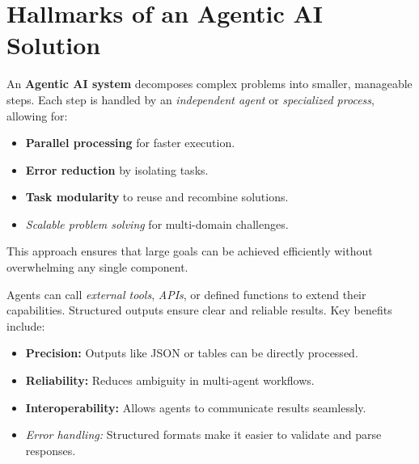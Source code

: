 \documentclass[a4paper, 12pt]{article}
\begin{document}
\section*{Hallmarks of an Agentic AI Solution}
\begin{tcolorbox}[title={1. Decomposition of Larger Problems into Smaller Steps}, colback=blue!5!white, colframe=blue!75!black]
An \textbf{Agentic AI system} decomposes complex problems into smaller, manageable steps. Each step is handled by an \textit{independent agent} or \textit{specialized process}, allowing for:  
\begin{itemize}
    \item \textbf{Parallel processing} for faster execution.
    \item \textbf{Error reduction} by isolating tasks.
    \item \textbf{Task modularity} to reuse and recombine solutions.
    \item \textit{Scalable problem solving} for multi-domain challenges.
\end{itemize}
This approach ensures that large goals can be achieved efficiently without overwhelming any single component.
\end{tcolorbox}
\vspace{0.5cm}
\begin{tcolorbox}[title={2. Use of Tools, Function Calling, and Structured Outputs}, colback=green!5!white, colframe=green!75!black]
Agents can call \textit{external tools}, \textit{APIs}, or defined functions to extend their capabilities. Structured outputs ensure clear and reliable results. Key benefits include:  
\begin{itemize}
    \item \textbf{Precision:} Outputs like JSON or tables can be directly processed.
    \item \textbf{Reliability:} Reduces ambiguity in multi-agent workflows.
    \item \textbf{Interoperability:} Allows agents to communicate results seamlessly.
    \item \textit{Error handling:} Structured formats make it easier to validate and parse responses.
\end{itemize}
\end{tcolorbox}
\vspace{0.5cm}
\end{document}
